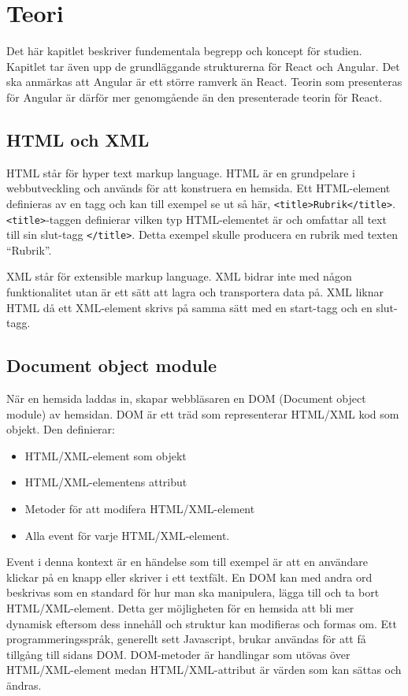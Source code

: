 \section{Teori}
\label{sec:axel-theory}
Det här kapitlet beskriver fundementala begrepp och koncept för studien. Kapitlet tar även upp de grundläggande strukturerna för React och Angular. Det ska anmärkas att Angular är ett större ramverk än React. Teorin som presenteras för Angular är därför mer genomgående än den presenterade teorin för React.

\subsection{HTML och XML}
HTML står för hyper text markup language. HTML är en grundpelare i webbutveckling och används för att konstruera en hemsida.\cite{w3-html} Ett HTML-element definieras av en tagg och kan till exempel se ut så här, \texttt{<title>Rubrik</title>}. \texttt{<title>}-taggen definierar vilken typ HTML-elementet är och omfattar all text till sin slut-tagg \texttt{</title>}. Detta exempel skulle producera en rubrik med texten ``Rubrik''. 

XML står för extensible markup language. XML bidrar inte med någon funktionalitet utan är ett sätt att lagra och transportera data på. XML liknar HTML då ett XML-element skrivs på samma sätt med en start-tagg och en slut-tagg.

\subsection{Document object module}
När en hemsida laddas in, skapar webbläsaren en DOM (Document object module) av hemsidan. DOM är ett träd som representerar HTML/XML kod som objekt. \cite{w3-htmldom} Den definierar:

\begin{itemize}
\item HTML/XML-element som objekt
\item HTML/XML-elementens attribut
\item Metoder för att modifera HTML/XML-element
\item Alla event för varje HTML/XML-element.
\end{itemize} 

Event i denna kontext är en händelse som till exempel är att en användare klickar på en knapp eller skriver i ett textfält. En DOM kan med andra ord beskrivas som en standard för hur man ska manipulera, lägga till och ta bort HTML/XML-element. Detta ger möjligheten för en hemsida att bli mer dynamisk eftersom dess innehåll och struktur kan modifieras och formas om. Ett programmeringsspråk, generellt sett Javascript, brukar användas för att få tillgång till sidans DOM. DOM-metoder är handlingar som utövas över HTML/XML-element medan HTML/XML-attribut är värden som kan sättas och ändras.

